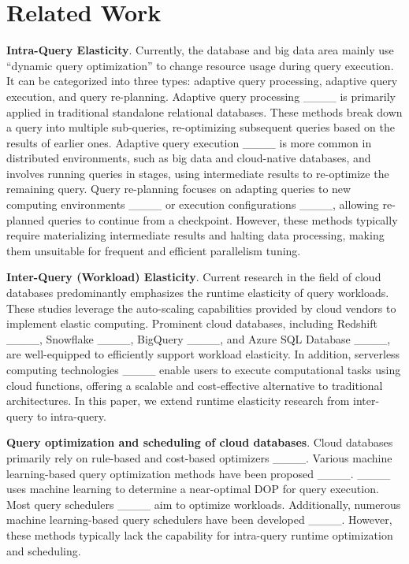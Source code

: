 \section{Related Work}
\textbf{Intra-Query Elasticity}. Currently, the database and big data area mainly use ``dynamic query optimization'' to change resource usage during query execution. It can be categorized into three types: adaptive query processing, adaptive query execution, and query re-planning. Adaptive query processing ____ is primarily applied in traditional standalone relational databases. These methods break down a query into multiple sub-queries, re-optimizing subsequent queries based on the results of earlier ones. Adaptive query execution ____ is more common in distributed environments, such as big data and cloud-native databases, and involves running queries in stages, using intermediate results to re-optimize the remaining query. Query re-planning focuses on adapting queries to new computing environments ____ or execution configurations ____, allowing re-planned queries to continue from a checkpoint. However, these methods typically require materializing intermediate results and halting data processing, making them unsuitable for frequent and efficient parallelism tuning.


\noindent\textbf{Inter-Query (Workload) Elasticity}. Current research in the field of cloud databases predominantly emphasizes the runtime elasticity of query workloads. These studies leverage the auto-scaling capabilities provided by cloud vendors to implement elastic computing. Prominent cloud databases, including Redshift ____, Snowflake ____, BigQuery ____, and Azure SQL Database ____, are well-equipped to efficiently support workload elasticity. In addition, serverless computing technologies ____ enable users to execute computational tasks using cloud functions, offering a scalable and cost-effective alternative to traditional architectures. In this paper, we extend runtime elasticity research from inter-query to intra-query.


\noindent\textbf{Query optimization and scheduling of cloud databases}. Cloud databases primarily rely on rule-based and cost-based optimizers ____. Various machine learning-based query optimization methods have been proposed ____. ____ uses machine learning to determine a near-optimal DOP for query execution. Most query schedulers ____ aim to optimize workloads. Additionally, numerous machine learning-based query schedulers have been developed ____.  However, these methods typically lack the capability for intra-query runtime optimization and scheduling.